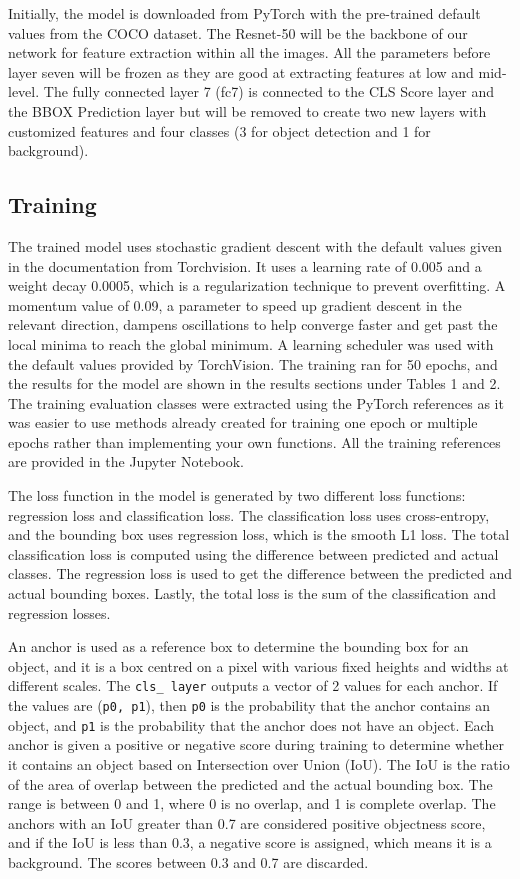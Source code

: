 \documentclass[conference]{IEEEtran}
\begin{document}
Initially, the model is downloaded from PyTorch with the pre-trained default values from the COCO dataset. The Resnet-50 will be the backbone of our network for 
feature extraction within all the images. All the parameters before layer seven will be frozen as they are good at extracting features at low and mid-level. 
The fully connected layer 7 (fc7) is connected to the CLS Score layer and the BBOX Prediction layer but will be removed to create two new layers with customized 
features and four classes (3 for object detection and 1 for background).

\FloatBarrier

\subsection{Training}
The trained model uses stochastic gradient descent with the default values given in the documentation from Torchvision. It uses a learning rate of 0.005 and a weight decay 
0.0005, which is a regularization technique to prevent overfitting. A momentum value of 0.09, a parameter to speed up gradient descent in the relevant direction, dampens 
oscillations to help converge faster and get past the local minima to reach the global minimum. A learning scheduler was used with the default values provided by TorchVision. 
The training ran for 50 epochs, and the results for the model are shown in the results sections under Tables 1 and 2. The training evaluation classes were extracted using the 
PyTorch references as it was easier to use methods already created for training one epoch or multiple epochs rather than implementing your own functions. All the training 
references are provided in the Jupyter Notebook.

The loss function in the model is generated by two different loss functions: regression loss and classification loss. The classification loss uses cross-entropy, and the 
bounding box uses regression loss, which is the smooth L1 loss. The total classification loss is computed using the difference between predicted and actual classes. 
The regression loss is used to get the difference between the predicted and actual bounding boxes. Lastly, the total loss is the sum of the classification and regression losses.

An anchor is used as a reference box to determine the bounding box for an object, and it is a box centred on a pixel with various fixed heights and widths at different scales. 
The \verb|cls_ layer| outputs a vector of 2 values for each anchor. If the values are (\verb |p0, p1|), then \verb|p0| is the probability that the anchor contains an object, and 
\verb|p1| is the probability that the anchor does not have an object. Each anchor is given a positive or negative score during training to determine whether it contains an object 
based on Intersection over Union (IoU). The IoU is the ratio of the area of overlap between the predicted and the actual bounding box. The range is between 0 and 1, where 0 is no 
overlap, and 1 is complete overlap. The anchors with an IoU greater than 0.7 are considered positive objectness score, and if the IoU is less than 0.3, a negative score is assigned, 
which means it is a background. The scores between 0.3 and 0.7 are discarded.
\end{document}
